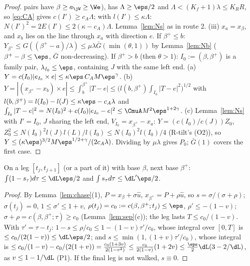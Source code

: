 \begin{proof}
pairs have $\beta\ge a_{\jW}\ge\We$), has $\Lambda\ge\eps/2$ and $\Lambda<(K_f+1)\lambda\le K_RR$, so \eqref{eq:CA} gives
$c(I')\ge c_A\Lambda$; with $l(I')\le\kappa\Lambda$: $N(I')^2=2E(I')\le2(\kappa-c_A)\Lambda$. Lemma~\ref{lem:Ns} as in route 2.
(iii) $x_a=x_\beta$, and $x_b$ lies on the line through $x_a$ with direction $e$. If $\beta^+\le b$:
$Y_{\beta^+}\le G((\beta^+-a)/\lambda)\le\mu\lambda\bar G(\min(\theta,1))$ by Lemma~\ref{lem:Nb} ($\beta^+-\beta\le\eps$, $\bar G$
non-decreasing). If $\beta^+>b$ (then $\theta>1$): $I_0:=(\beta,\beta^+)$ is a family pair, $\lambda_{I_0}\le\eps$, containing $J$
with the same left end. (a) $Y=c(I_0)|e_{I_0}\times e|\le\kappa\eps\,C_AM\eps^\gamma$. (b) $Y=|(x_{\beta^+}-x_b)\times e|\le
\int_b^{\beta^+}|T-e|\le\bigl(l(b,\beta^+)\int_{I_0}|T-e|^2\bigr)^{1/2}$ with $l(b,\beta^+)=l(I_0)-l(J)\le\kappa\eps-c_A\lambda$ and
$\int_{I_0}|T-e|^2=N(I_0)^2+c(I_0)|e_{I_0}-e|^2\le\CmuA M^2\eps^{1+2\gamma}$. (c) Lemma~\ref{lem:Ns} with $I'=I_0$, $J$ sharing the left end, $V_{I_0}=x_{\beta^+}-x_a$: $Y=(c(I_0)/c(J))Z_0$,
$Z_0^2\le N(I_0)^2l(J)l(L)/l(I_0)\le N(I_0)^2l(I_0)/4$ (R-tilt's (O2)), so $Y\le(\kappa\eps)^{3/2}M\eps^{1/2+\gamma}/(2c_A\lambda)$. Dividing by $\mu\lambda$ gives $P_0$; $\bar G(1)$ covers the first case.
\end{proof}

\begin{lemma}\label{lem:Na}
On a leg $[t_j,t_{j+1}]$ (or a part of it) with base $\beta$, next base $\beta^+$:
$\int(1-s_\tau)d\tau\le\dL\eps/2$ and $\int s_\tau d\tau\le\dL'\eps/2$.
\end{lemma}
\begin{proof}
By Lemma~\ref{lem:chase}(1), $P=x_\beta+\sigma\hat u$, $x_{\beta^+}=P+\rho\hat u$, so $s=\sigma/(\sigma+\rho)$; $\sigma(t_j)=0$,
$1\le\sigma'\le1+v$, $\rho(t_j)=c_0:=c(\beta,\beta^+;t_j)\le\eps$, $\rho'\le-(1-v)$; $\sigma+\rho=c(\beta,\beta^+;\tau)\ge c_0$
(Lemma~\ref{lem:sep}(c)); the leg lasts $T\le c_0/(1-v)$. With $\tau'=\tau-t_j$: $1-s\le\rho/c_0\le1-(1-v)\tau'/c_0$, whose integral
over $[0,T]$ is $\le c_0/(2(1-v))\le\dL\eps/2$; and $s\le\min(1,(1+v)\tau'/c_0)$, whose integral is
$\le c_0/(1-v)-c_0/(2(1+v))=\frac{c_0(1+3v)}{2(1-v^2)}\le\frac{c_0}{2(1-v)}(1+2v)\le\frac\eps2\dL(3-2/\dL)$, as
$v\le1-1/\dL$ (P1). If the final leg is not walked, $s\equiv0$.
\end{proof}

